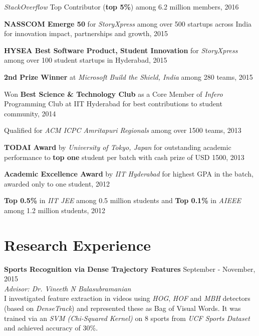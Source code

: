 \documentclass[margin,line]{res}
\begin{document}
\begin{resume}
  {\it StackOverflow} Top Contributor ({\bf top 5\%}) among 6.2 million members, 2016

  \vspace*{-2.5mm}

  {\bf NASSCOM Emerge 50} for {\it StoryXpress} among over 500 startups across India for innovation impact, partnerships and growth, 2015

  \vspace*{-2.5mm}

  {\bf HYSEA Best Software Product, Student Innovation} for {\it StoryXpress} among over 100 student startups in Hyderabad, 2015

  \vspace*{-2.5mm}

  {\bf 2nd Prize Winner} at {\it Microsoft Build the Shield, India} among 280 teams, 2015

  \vspace*{-2.5mm}

  Won {\bf Best Science \& Technology Club} as a Core Member of {\it Infero} Programming Club at IIT Hyderabad for best contributions to student community, 2014

  \vspace*{-2.5mm}

  Qualified for {\it ACM ICPC Amritapuri Regionals} among over 1500 teams, 2013

  \vspace*{-2.5mm}

  {\bf TODAI Award} by {\it University of Tokyo, Japan} for outstanding academic performance to {\bf top one} student per batch with cash prize of USD 1500, 2013

  \vspace*{-2.5mm}

  {\bf Academic Excellence Award} by {\it IIT Hyderabad} for highest GPA in the batch, awarded only to one student, 2012

  \vspace*{-2.5mm}

  {\bf Top 0.5\%} in {\it IIT JEE} among 0.5 million students and {\bf Top 0.1\%} in {\it AIEEE} among 1.2 million students, 2012

\section{\sc Research Experience}

  {\bf Sports Recognition via Dense Trajectory Features} \hfill September - November, 2015 \\
  	{\em Advisor: Dr. Vineeth N Balasubramanian} \\
  	I investigated feature extraction in videos using {\it HOG}, {\it HOF} and {\it MBH} detectors (based on {\it DenseTrack}) and represented these as Bag of Visual Words. It was trained via an {\it SVM (Chi-Squared Kernel)} on 8 sports from {\it UCF Sports Dataset} and achieved accuracy of 30\%.


\end{resume}
\end{document}
